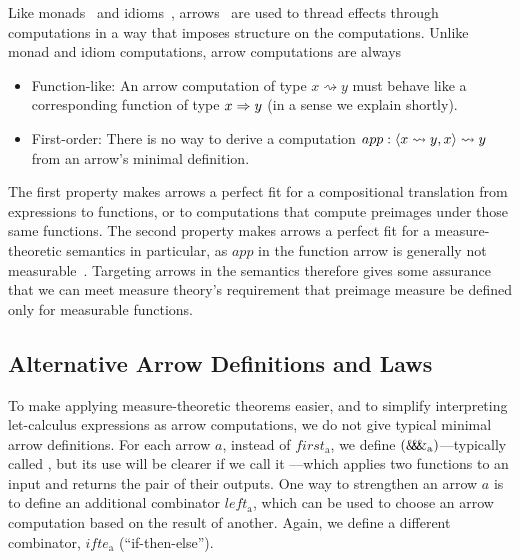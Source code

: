 \documentclass{llncs}
\newcommand{\arrow}{\rightsquigarrow}
\newcommand{\arrowpair}{\ensuremath{\mathit{\&\mspace{-7.5mu}\&\mspace{-7.5mu}\&}}}
\newcommand{\arrowif}{\ensuremath{ifte}}
\newcommand{\gen}{_\mathrm{a}}
\begin{document}
Like monads~\cite{cit:wadler-2001-monads} and idioms~\cite{cit:mcbride-2008jfp-idiom}, arrows~\cite{cit:hughes-2000scp-arrows} are used to thread effects through computations in a way that imposes structure on the computations.
Unlike monad and idiom computations, arrow computations are always
\begin{itemize}
	\item Function-like: An arrow computation of type $x \arrow y$ must behave like a corresponding function of type $x \Rightarrow y$ (in a sense we explain shortly).
	\item First-order: There is no way to derive a computation $app : \pair{x \arrow y, x} \arrow y$ from an arrow's minimal definition.
\end{itemize}
The first property makes arrows a perfect fit for a compositional translation from expressions to functions, or to computations that compute preimages under those same functions.
The second property makes arrows a perfect fit for a measure-theoretic semantics in particular, as $app$ in the function arrow is generally not measurable~\cite{cit:aumann-1961ijm-borel}.
Targeting arrows in the semantics therefore gives some assurance that we can meet measure theory's requirement that preimage measure be defined only for measurable functions.

\subsection{Alternative Arrow Definitions and Laws}
\label{sec:arrow-definitions}

To make applying measure-theoretic theorems easier, and to simplify interpreting let-calculus expressions as arrow computations, we do not give typical minimal arrow definitions.
For each arrow $a$, instead of $first\gen$, we define $(\arrowpair\gen)$---typically called , but its use will be clearer if we call it ---which applies two functions to an input and returns the pair of their outputs.
One way to strengthen an arrow $a$ is to define an additional combinator $left\gen$, which can be used to choose an arrow computation based on the result of another.
Again, we define a different combinator, $\arrowif\gen$ (``if-then-else'').
\end{document}
